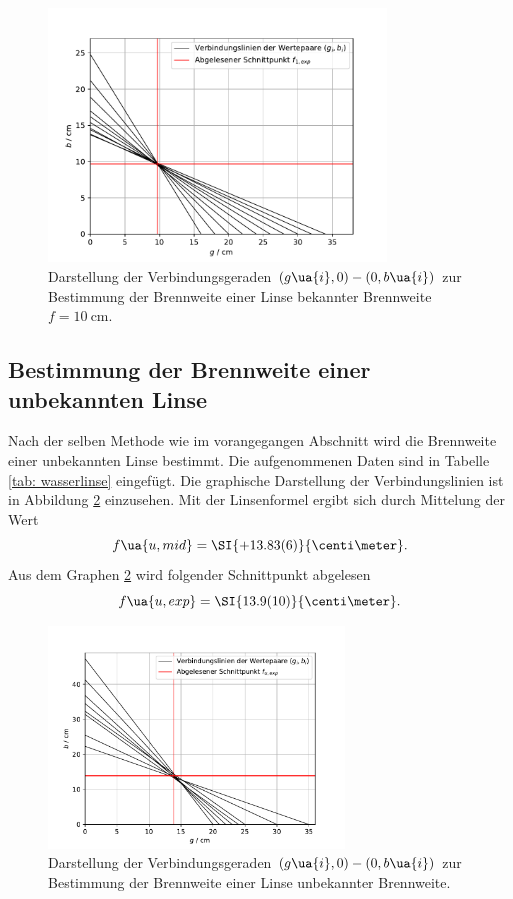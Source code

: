 \begin{figure}
  \centering
  \includegraphics[width=0.8\textwidth]{../Messdaten/plots/methode_1.pdf}
  \caption{Darstellung der Verbindungsgeraden $(g\ua{i}, 0) - (0, b\ua{i})$ zur Bestimmung der Brennweite einer
  Linse bekannter Brennweite $f = \SI{10}{\centi\meter}$.}
  \label{fig: methode_1}
\end{figure}

\subsection{Bestimmung der Brennweite einer unbekannten Linse}
Nach der selben Methode wie im vorangegangen Abschnitt wird die Brennweite einer unbekannten Linse bestimmt.
Die aufgenommenen Daten sind in Tabelle \ref{tab: wasserlinse} eingefügt. Die graphische Darstellung der Verbindungslinien ist %
in Abbildung \ref{fig: wasserlinse} einzusehen. Mit der Linsenformel ergibt sich durch Mittelung der Wert
\begin{equation}
  f\ua{u, mid} = \SI{+13.83(6)}{\centi\meter}. %
\end{equation}
Aus dem Graphen \ref{fig: wasserlinse} wird folgender Schnittpunkt abgelesen
\begin{equation}
  f\ua{u, exp} = \SI{13.9(10)}{\centi\meter}.
\end{equation}

\begin{figure}
  \centering
  \includegraphics[width = 0.7\textwidth]{../Messdaten/plots/wasserlinse.pdf}
  \caption{Darstellung der Verbindungsgeraden $(g\ua{i}, 0) - (0, b\ua{i})$ zur Bestimmung der Brennweite einer
  Linse unbekannter Brennweite.}
  \label{fig: wasserlinse}
\end{figure}
